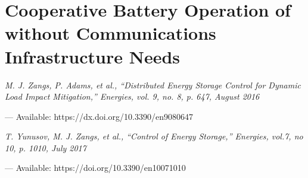 \chapter{Cooperative Battery Operation of without Communications Infrastructure Needs}
\label{ch4}

\singlespacing
\epigraph{\textit{M. J. Zangs, P. Adams, et al., ``Distributed Energy Storage Control for Dynamic Load Impact Mitigation,'' Energies, vol. 9, no. 8, p. 647, August 2016}}{--- Available: https://dx.doi.org/10.3390/en9080647}
\epigraph{\textit{T. Yunusov, M. J. Zangs, et al., ``Control of Energy Storage,'' Energies, vol.7, no 10, p. 1010, July 2017}}{--- Available: https://doi.org/10.3390/en10071010}
\doublespacing











